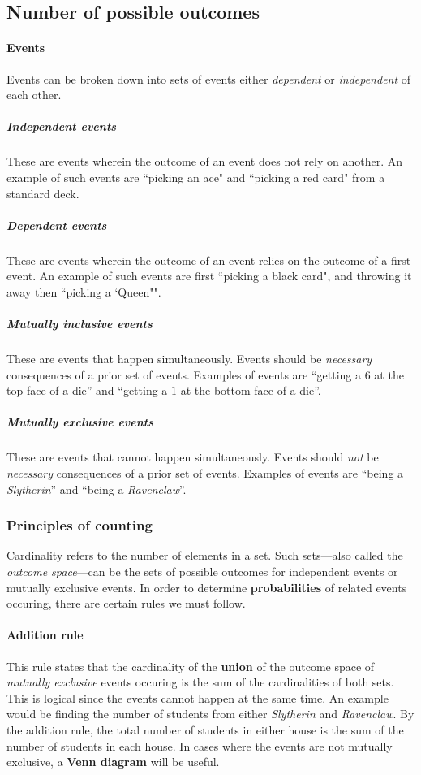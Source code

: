\subsection{Number of possible outcomes}

\paragraph{Events}
Events can be broken down into sets of events either \emph{dependent} or \emph{independent} of each other.

\subparagraph{Independent events}
These are events wherein the outcome of an event does not rely on another.
An example of such events are ``picking an ace" and ``picking a red card" from a standard deck.

\subparagraph{Dependent events}
These are events wherein the outcome of an event relies on the outcome of a first event.
An example of such events are first ``picking a black card", and throwing it away then ``picking a `Queen"\!".

\subparagraph{Mutually inclusive events}
These are events that happen simultaneously.
Events should be \emph{necessary} consequences of a prior set of events.
Examples of events are ``getting a $6$ at the top face of a die'' and ``getting a $1$ at the bottom face of a die''.

\subparagraph{Mutually exclusive events}
These are events that cannot happen simultaneously.
Events should \emph{not} be \emph{necessary} consequences of a prior set of events.
Examples of events are ``being a \textit{Slytherin}'' and ``being a \textit{Ravenclaw}''.

\subsubsection{Principles of counting}
Cardinality refers to the number of elements in a set.
Such sets---also called the \emph{outcome space}---can be the sets of possible outcomes for independent events or mutually exclusive events.
In order to determine \textbf{probabilities} of related events occuring, there are certain rules we must follow.

\paragraph{Addition rule}
This rule states that the cardinality of the \textbf{union} of the outcome space of \emph{mutually exclusive} events occuring is the sum of the cardinalities of both sets.
This is logical since the events cannot happen at the same time.
An example would be finding the number of students from either \textit{Slytherin} and \textit{Ravenclaw}.
By the addition rule, the total number of students in either house is the sum of the number of students in each house.
In cases where the events are not mutually exclusive, a \textbf{Venn diagram} will be useful.

